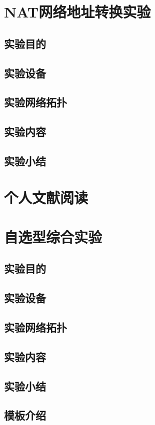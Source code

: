 \documentclass[lang=cn,11pt,a4paper,cite=authoryear]{elegantpaper}
\begin{document}
\section{NAT网络地址转换实验}
\subsection{实验目的}
\subsection{实验设备}
\subsection{实验网络拓扑}
\subsection{实验内容}
\subsection{实验小结}
\section{个人文献阅读}
\section{自选型综合实验}
\subsection{实验目的}
\subsection{实验设备}
\subsection{实验网络拓扑}
\subsection{实验内容}
\subsection{实验小结}

\subsection{模板介绍}
\end{document}
